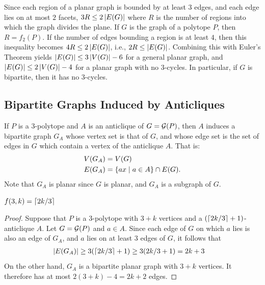         Since each region of a planar graph is bounded by at least \(3\) edges, and each edge lies on at most \(2\) facets, \(3R\le2\left\lvert E(G)\right\rvert\) where \(R\) is the number of regions into which the graph divides the plane.  If \(G\) is the graph of a polytope \(P\), then \(R=f_2(P)\).  If the number of edges bounding a region is at least \(4\), then this inequality becomes \(4R\le2\left\lvert E(G)\right\rvert\), i.e.{}, \(2R\le\left\lvert E(G)\right\rvert\).  Combining this with Euler's Theorem yields \(\left\lvert E(G)\right\rvert\le3\left\lvert V(G)\right\rvert-6\) for a general planar graph, and \(\left\lvert E(G)\right\rvert\le2\left\lvert V(G)\right\rvert-4\) for a planar graph with no \(3\)-cycles.  In particular, if \(G\) is bipartite, then it has no \(3\)-cycles.

    \subsection{Bipartite Graphs Induced by Anticliques}

    If \(P\) is a \(3\)-polytope and \(A\) is an anticlique of \(G=\mathcal{G}(P)\), then \(A\) induces a bipartite graph \(G_A\) whose vertex set is that of \(G\), and whose edge set is the set of edges in \(G\) which contain a vertex of the anticlique \(A\).  That is:
        \begin{align*}
            V(G_A)
                &=  V(G)\\
            E(G_A)
                &=  \setb{ax}{a\in A}\cap E(G).
        \end{align*}
    Note that \(G_A\) is planar since \(G\) is planar, and \(G_A\) is a subgraph of \(G\).

    \begin{Theorem}
        \(f(3,k)=\left\lceil2k/3\right\rceil\)
    \end{Theorem}
    \begin{proof}
        Suppose that \(P\) is a \(3\)-polytope with \(3+k\) vertices and a \((\left\lceil2k/3\right\rceil+1)\)-anticlique \(A\).  Let \(G=\mathcal{G}(P)\) and \(a\in A\).  Since each edge of \(G\) on which \(a\) lies is also an edge of \(G_A\), and \(a\) lies on at least \(3\) edges of \(G\), it follows that
            \begin{align*}
                \left\lvert E(G_A)\right\rvert
                    &\ge
                        3(\left\lceil2k/3\right\rceil+1)
                    \ge
                        3(2k/3+1)
                    =
                        2k+3
            \end{align*}
        On the other hand, \(G_A\) is a bipartite planar graph with \(3+k\) vertices.  It therefore has at most \(2(3+k)-4=2k+2\) edges.
    \end{proof}




